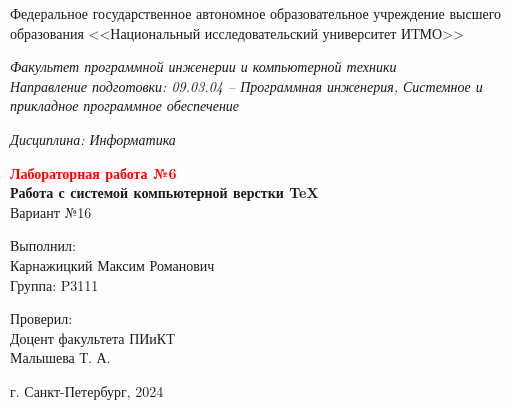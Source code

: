 \onecolumn
\thispagestyle{empty}

{
\fontsize{14pt}{20pt}
\selectfont

\begin{center}
    Федеральное государственное автономное образовательное учреждение высшего образования <<Национальный исследовательский университет ИТМО>> \\
\end{center}

\begin{center}
    \textit{Факультет программной инженерии и компьютерной техники \\ 
    Направление подготовки: 09.03.04 – Программная инженерия, Системное и прикладное программное обеспечение}
\end{center}

\begin{center}
    \textit{Дисциплина: Информатика}
\end{center}

{
\fontsize{16pt}{20pt}
\selectfont
\vspace{3cm}
\begin{center}
    \textbf{\textcolor{red}{Лабораторная работа №6} \\
    Работа с системой компьютерной верстки \TeX} \\
    Вариант №16
\end{center}
}


\vspace{6cm}
\begin{flushright}
    Выполнил: \\
    Карнажицкий Максим Романович \\
    Группа: P3111 \\
\end{flushright}
\begin{flushright}
    Проверил: \\
    Доцент факультета ПИиКТ \\
    Малышева Т. А.
\end{flushright}

\vfill

\begin{center}
    г. Санкт-Петербург, 2024
\end{center}

}